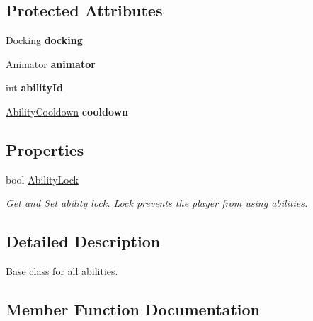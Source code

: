 \subsection*{Protected Attributes}
\begin{DoxyCompactItemize}
\item 
\hypertarget{class_ability_a2490756d6bc0af64a746bd50151b714d}{}\label{class_ability_a2490756d6bc0af64a746bd50151b714d} 
\hyperlink{class_docking}{Docking} {\bfseries docking}
\item 
\hypertarget{class_ability_a2f557812a0519c7b0dd983bbf96fa0ba}{}\label{class_ability_a2f557812a0519c7b0dd983bbf96fa0ba} 
Animator {\bfseries animator}
\item 
\hypertarget{class_ability_adbb00fc8d6f071d01d9211dccdea907b}{}\label{class_ability_adbb00fc8d6f071d01d9211dccdea907b} 
int {\bfseries ability\+Id}
\item 
\hypertarget{class_ability_a0dc80ce2547cec495a453fbe01aa1724}{}\label{class_ability_a0dc80ce2547cec495a453fbe01aa1724} 
\hyperlink{class_ability_cooldown}{Ability\+Cooldown} {\bfseries cooldown}
\end{DoxyCompactItemize}
\subsection*{Properties}
\begin{DoxyCompactItemize}
\item 
bool \hyperlink{class_ability_a0fbbf8eda910cd9463db7ef474da6019}{Ability\+Lock}
\begin{DoxyCompactList}\small\item\em Get and Set ability lock. Lock prevents the player from using abilities. \end{DoxyCompactList}\end{DoxyCompactItemize}


\subsection{Detailed Description}
Base class for all abilities. 



\subsection{Member Function Documentation}
\hypertarget{class_ability_a7722265862f8b29828315725415ce266}{}\label{class_ability_a7722265862f8b29828315725415ce266} 
